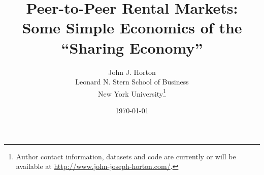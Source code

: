 \documentclass[11pt]{article}
\begin{document}
 

\title{Peer-to-Peer Rental Markets: \\ Some Simple Economics of the ``Sharing Economy''} 

\date{\today}

\author{John J. Horton \\ Leonard N. Stern School of Business \\ New York University\footnote{ Author contact information, datasets and code are currently or will be available at \href{http://www.john-joseph-horton.com/}{http://www.john-joseph-horton.com/}. } }
\maketitle

\end{document}
